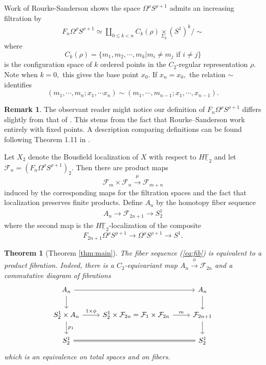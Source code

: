 \documentclass[]{amsart}  %
\newtheorem*{thm*}{Theorem}
\theoremstyle{definition}
\newtheorem{rmk}[equation]{Remark}
\numberwithin{equation}{section}
\numberwithin{figure}{section}
\newcommand{\mF}{{\mathbb F}}
\newcommand{\cF}{{\mathcal F}}
\newcommand{\umF}{\underline{\mF}}
\newcommand{\0}{\langle 0 \rangle}
\begin{document}
Work of Rourke-Sanderson \cite{RS200} shows the space $\Omega^\rho S^{\rho + 1}$ admits an increasing filtration by 
\begin{align} \label{eq:filtration}
    F_n \Omega^\rho S^{\rho + 1} \simeq \underset{0 \leq k < n}{\displaystyle{\coprod}} C_k (\rho) \underset{\Sigma_k}{\times} (S^1)^k/ \sim
\end{align}
where
\[
C_k (\rho) = \{m_1, m_2, \cdots, m_k | m_i \neq m_j \text{ if } i \ne j \}
\]
is the configuration space of $k$ ordered points in the $C_2$-regular representation $\rho.$ Note when $k = 0,$ this gives the base point $x_0.$ If $x_n = x_0,$ the relation $\sim$ identifies
\[
(m_1, \cdots, m_n; x_1, \cdots x_n) \sim (m_1, \cdots, m_{n -1}; x_1, \cdots, x_{n - 1}).
\]
\begin{rmk}
    The observant reader might notice our definition of $F_n \Omega^\rho S^{\rho + 1}$ differs slightly from that of \cite{RS200}. This stems from the fact that Rourke--Sanderson work entirely with fixed points. A description comparing definitions can be found following Theorem 1.11 in \cite{GuillouMay2017}.
\end{rmk}
Let $X_2$ denote the Bousfield localization of $X$ with respect to $H {\umF_2}$ and let $\cF_n = (F_n \Omega^\rho S^{\rho + 1})_2.$
Then there are product maps 
$$ \cF_m \times \cF_n \overset{\mu}{\rightarrow} \cF_{m + n} $$
induced by the corresponding maps for the filtration spaces and the fact that localization preserves finite products. Define $A_n$ by the homotopy fiber sequence 
\begin{align} \label{eq:fib}
	A_n \to \cF_{2n + 1} \to S^1_2
\end{align}
where the second map is the $H \umF_2$-localization of the composite
$$ F_{2n + 1} \Omega^\rho S^{\rho + 1} \to \Omega^\rho S^{\rho + 1} \to S^1. $$ 

\begin{thm*}[Theorem \ref{thm:main}]
    The fiber sequence (\ref{eq:fib}) is equivalent to a product fibration. Indeed, there is a $C_2$-equivariant map $A_n \overset{\phi}{\rightarrow} \cF_{2n}$ and a commutative diagram of fibrations
	\[
	\begin{tikzcd}
		A_n \arrow[rr] \arrow[d]{} & & A_n \arrow[d] \\
			S_2^1 \times A_n \arrow[r, "1 \times \phi"] \arrow[d, "p_1"] & S_2^1 \times \cF_{2n}= \cF_1 \times \cF_{2n} \arrow[r, "m"] & \cF_{2n + 1} \arrow[d] \\
			S_2^1 \arrow[rr, equal] & & S_2^1 
		\end{tikzcd}
		\]
		which is an equivalence on total spaces and on fibers.
		
\end{thm*}
\end{document}

